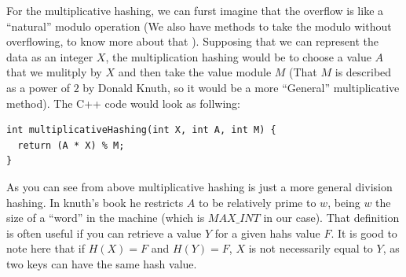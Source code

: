 For the multiplicative hashing, we can furst imagine that the overflow is like a ``natural'' modulo operation (We also have methods to take the modulo without overflowing, to know more about that ). Supposing that we can represent the data as an integer \( X \), the multiplication hashing would be to choose a value \( A \) that we mulitply by \( X \) and then take the value module \( M \) (That \( M \) is described as a power of \( 2 \) by Donald Knuth, so it would be a more ``General'' multiplicative method). The C++ code would look as follwing:

\medskip

\begin{lstlisting}
int multiplicativeHashing(int X, int A, int M) {
  return (A * X) % M; 
}
\end{lstlisting}

As you can see from above multiplicative hashing is just a more general division hashing. In knuth's book he restricts \( A \) to be relatively prime to \( w \), being \( w \) the size of a ``word'' in the machine (which is \( MAX\_INT \) in our case). That definition is often useful if you can retrieve a value \( Y \) for a given hahs value \( F \). It is good to note here that if \( H(X) = F \) and \( H(Y) = F \), \( X \) is not necessarily equal to \( Y \), as two keys can have the same hash value.